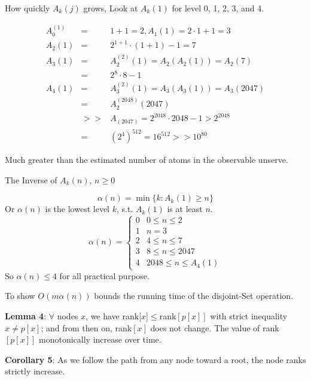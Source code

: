 \documentclass{beamer}
\begin{document}
\begin{frame}{}

\centerline{How quickly $A_k(j)$ grows, Look at $A_k(1)$ for level 0, 1, 2, 3, and 4.}
\begin{small}
\begin{eqnarray*}
A_0^{(1)} &=& 1+1 = 2, 
A_1(1) = 2\cdot 1 + 1 = 3 \\
A_2(1) &=& 2^{1+1}\cdot (1+1) - 1 = 7 \\
A_3(1) &=& A_2^{(2)}(1) = A_2(A_2(1)) = A_2(7) \\
 &=& 2^8\cdot 8 -1 \\
A_4(1) &=& A_3^{(2)} (1) = A_3(A_3(1)) = A_3(2047) \\
 &=& A_2 ^{(2048)}(2047) \\
 &>>& A_(2047)=2^{2048}\cdot2048-1 > 2^{2048} \\
 &=& (2^4)^{512} 
 = 16^{512} 
 >> 10^{80}
\end{eqnarray*}
\end{small}
Much greater than the estimated number of atoms in the observable unserve. 
\end{frame}

\begin{frame}{}

\centerline{The Inverse of $A_k{(n)}$, $n\ge 0$}
\begin{equation}
\alpha(n)=\min\{k: A_k(1)\ge n\}
\end{equation}
Or $\alpha (n)$ is the lowest level $k$, s.t. $A_k(1)$ is at least $n$. 
$$
\alpha(n) = \left\{
\begin{array}{ll}
0 & 0\le n \le 2 \\
1 & n=3 \\
2 & 4\le n \le 7 \\
3 & 8\le n \le 2047 \\
4 & 2048 \le n \le A_4(1)
\end{array}
\right.
$$
So $\alpha(n)\le 4$ for all practical purpose. 
\end{frame}

\begin{frame}{}

To show $O(m\alpha(n))$ bounds the running time of the disjoint-Set operation. 

{\bf Lemma 4}: $\forall$ nodes $x$, we have rank[$x$]$\le$rank$[p[x]]$ with strict inequality
$x\ne p[x]$; and from then on, rank$[x]$ does not change. The value of rank$[p[x]]$ 
monotonically increase over time. 

{\bf Corollary 5}: As we follow the path from any node toward a root, the node ranks 
strictly increase. 
\end{frame}
\end{document}

